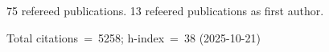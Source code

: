 75 refereed publications. 13 refeered publications as first author.

Total citations~=~5258; h-index~=~38 (2025-10-21)
